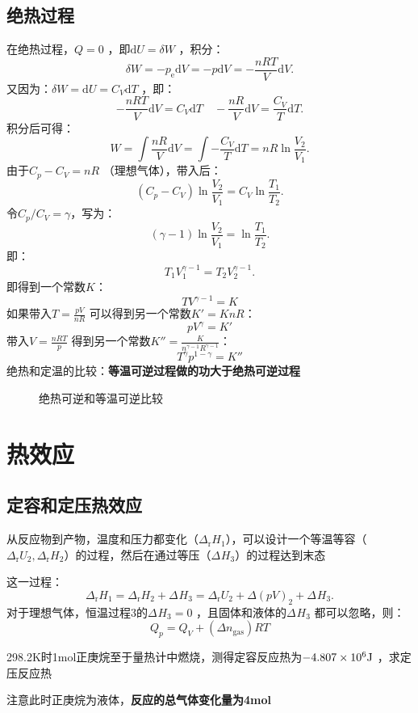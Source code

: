 \subsection{绝热过程}%
\label{sub:绝热过程}
在绝热过程，$Q=0$ ，即$\mathrm{d}U = \delta W$ ，积分：\[
    \delta W = -p_\text{e}\mathrm{d}V = -p\mathrm{d}V = -\frac{nRT }{V}\mathrm{d}V
.\]
又因为：$\delta W = \mathrm{d}U = C_{V}\mathrm{d}T$ ，即：\[
    -\frac{nRT }{V}\mathrm{d}V = C_{V}\mathrm{d}T \quad -\frac{nR}{V}\mathrm{d}V = \frac{C_{V}}{T}\mathrm{d}T
.\]积分后可得：\[
    W = \int \frac{nR }{V} \mathrm{d}V = \int -\frac{C_{V}}{T} \mathrm{d}T = nR \ln \frac{V_2}{V_1}
.\]
由于$C_{p}-C_{V} = nR$ （理想气体），带入后：\[
    \left( C_{p}-C_{V} \right)\ln \frac{V_2}{V_1}=C_{V}\ln \frac{T_1}{T_2}
.\]
令$C_{p}/C_{V}=\gamma$，写为：
\[
    \left( \gamma-1 \right)\ln \frac{V_2}{V_1} = \ln \frac{T_1}{T_2}
.\]
即：\[
    T_1V_1^{\gamma-1} = T_2V_2^{\gamma-1}
.\]
即得到一个常数$K$：
\begin{equation}
    \label{eq:TV-K}
    TV^{\gamma-1} = K
\end{equation}
如果带入$T=\frac{pV}{nR}$ 可以得到另一个常数$K'=KnR$：
\begin{equation}
    \label{eq:pV-K'}
    pV^{\gamma} = K'
\end{equation}
带入$V=\frac{nRT }{p}$ 得到另一个常数$K''=\frac{K}{n^{\gamma-1}R^{\gamma-1}}$：
\begin{equation}
    \label{eq:Tp-K''}
    T^{\gamma}p^{1-\gamma}=K''
\end{equation}
绝热和定温的比较：\textbf{等温可逆过程做的功大于绝热可逆过程}
\begin{figure}[ht!]
    \centering
    \caption{绝热可逆和等温可逆比较}
    \label{fig:绝热可逆和等温可逆比较}
\end{figure}
\section{热效应}%
\label{sec:热效应}
\subsection{定容和定压热效应}%
\label{sub:定容和定压热效应}
\begin{eg}
    从反应物到产物，温度和压力都变化（$\Delta_\text{r}H_1 $），可以设计一个等温等容（$\Delta_\text{r}U_2, \Delta_\text{r}H_2  $）的过程，然后在通过等压（$\Delta_\text{}H_3 $）的过程达到末态
\end{eg}
这一过程：\[
    \Delta_\text{r}H_1 = \Delta_\text{r}H_2 + \Delta_\text{}H_3 = \Delta_\text{r}U_2 + \Delta\left( pV \right)_2 + \Delta_\text{}H_3    
.\]
对于理想气体，恒温过程3的$\Delta_\text{}H_3=0 $ ，且固体和液体的$\Delta_\text{}H_3 $ 都可以忽略，则：
\begin{equation}
    \label{eq:Qp->QV}
    Q_{p} = Q_{V} + \left( \Delta n_\text{gas} \right)RT
\end{equation}
\begin{eg}
    298.2K时1mol正庚烷至于量热计中燃烧，测得定容反应热为$-4.807\times 10^{6}\ce{J}$ ，求定压反应热
\end{eg}
注意此时正庚烷为液体，\textbf{反应的总气体变化量为4mol}
